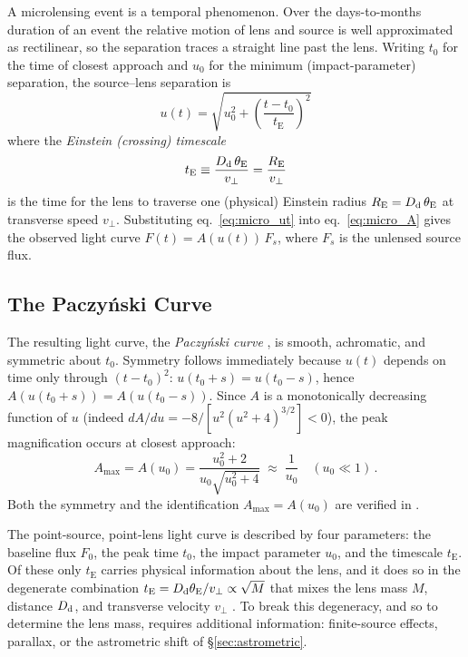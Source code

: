 A microlensing event is a temporal phenomenon.  Over the days-to-months
duration of an event the relative motion of lens and source is well
approximated as rectilinear, so the separation traces a straight line past the
lens.  Writing $t_0$ for the time of closest approach and $u_0$ for the
minimum (impact-parameter) separation, the source--lens separation is
\citep[eq.~8]{schneider_kochanek_wambsganss_2006}
\begin{equation}
    \boxed{\;u(t) = \sqrt{u_0^2 + \left(\frac{t - t_0}{t_{\mathrm{E}}}\right)^2}\;}
    \label{eq:micro_ut}
\end{equation}
where the \emph{Einstein (crossing) timescale}
\begin{equation}
    t_{\mathrm{E}} \equiv \frac{D_{\mathrm{d}}\,\theta_{\mathrm{E}}}{v_\perp}
    = \frac{R_{\mathrm{E}}}{v_\perp}
    \label{eq:micro_tE}
\end{equation}
is the time for the lens to traverse one (physical) Einstein radius
$R_{\mathrm{E}} = D_{\mathrm{d}}\,\theta_{\mathrm{E}}$ at transverse speed $v_\perp$.  Substituting
eq.~\eqref{eq:micro_ut} into eq.~\eqref{eq:micro_A} gives the observed light
curve $F(t) = A(u(t))\,F_s$, where $F_s$ is the unlensed source flux.

\subsection{The Paczy\'nski Curve}

The resulting light curve, the \emph{Paczy\'nski curve}
\citep{paczynski_1986}, is smooth, achromatic, and symmetric about
$t_0$.  Symmetry follows immediately because $u(t)$ depends on time only
through $(t-t_0)^2$: $u(t_0+s) = u(t_0-s)$, hence
$A(u(t_0+s)) = A(u(t_0-s))$.  Since $A$ is a monotonically decreasing function
of $u$ (indeed $dA/du = -8/[u^2(u^2+4)^{3/2}] < 0$), the peak magnification
occurs at closest approach:
\begin{equation}
    A_{\max} = A(u_0) = \frac{u_0^2 + 2}{u_0\sqrt{u_0^2 + 4}}
    \;\approx\; \frac{1}{u_0}
    \quad (u_0 \ll 1) \,.
    \label{eq:micro_Amax}
\end{equation}
Both the symmetry and the identification $A_{\max} = A(u_0)$ are verified in
.

The point-source, point-lens light curve is described by four parameters:
the baseline flux $F_0$, the peak time $t_0$, the impact parameter $u_0$, and
the timescale $t_{\mathrm{E}}$.  Of these only $t_{\mathrm{E}}$ carries
physical information about the lens, and it does so in the degenerate
combination $t_{\mathrm{E}} = D_{\mathrm{d}}\theta_{\mathrm{E}}/v_\perp \propto \sqrt{M}$ that mixes
the lens mass $M$, distance $D_{\mathrm{d}}$, and transverse velocity $v_\perp$
\citep[Sect.~1.2]{schneider_kochanek_wambsganss_2006}.  To break this
degeneracy, and so to determine the lens mass, requires additional
information: finite-source effects, parallax, or the astrometric shift of
\S\ref{sec:astrometric}.

